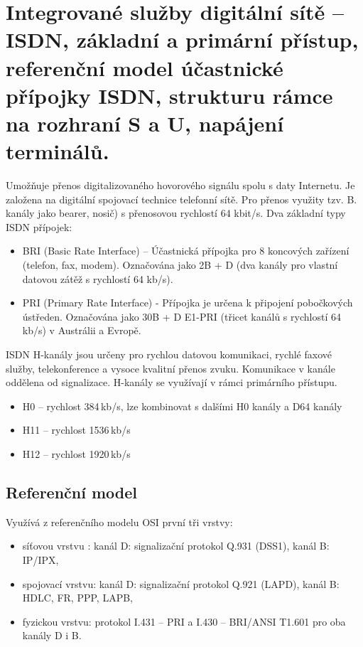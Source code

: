 \clearpage
\section{Integrované služby digitální sítě – ISDN, základní a primární přístup, referenční model účastnické přípojky ISDN, strukturu rámce na rozhraní S a U, napájení terminálů.}
Umožňuje přenos digitalizovaného hovorového signálu spolu s daty Internetu. Je založena na digitální spojovací technice telefonní sítě.
Pro přenos využity tzv. B. kanály jako bearer, nosič) s přenosovou rychlostí 64 kbit/s.
Dva základní typy ISDN přípojek:
\begin{itemize}
    \item BRI (Basic Rate Interface) – Účastnická přípojka pro 8 koncových zařízení (telefon, fax, modem). Označována jako 2B + D (dva kanály pro vlastní datovou zátěž s rychlostí 64 kb/s).
    \item PRI (Primary Rate Interface) - Přípojka je určena k připojení pobočkových ústředen. Označována jako 30B + D E1-PRI (třicet kanálů s rychlostí 64 kb/s) v Austrálii a Evropě.
\end{itemize}

ISDN H-kanály jsou určeny pro rychlou datovou komunikaci, rychlé faxové služby, telekonference a vysoce kvalitní přenos zvuku. Komunikace v kanále oddělena od signalizace. H-kanály se využívají v rámci primárního přístupu.
\begin{itemize}
    \item H0 -- rychlost 384\,kb/s, lze kombinovat s dalšími H0 kanály a D64 kanály
    \item H11 -- rychlost 1536\,kb/s
    \item H12 -- rychlost 1920\,kb/s
\end{itemize}

\subsection{Referenční model}
Využívá z referenčního modelu OSI první tři vrstvy:
\begin{itemize}
    \item síťovou vrstvu : kanál D: signalizační protokol Q.931 (DSS1), kanál B: IP/IPX,
    \item spojovací vrstvu: kanál D: signalizační protokol Q.921 (LAPD), kanál B: HDLC, FR, PPP, LAPB,
    \item fyzickou vrstvu: protokol I.431 – PRI a I.430 – BRI/ANSI T1.601 pro oba kanály D i B. 
\end{itemize}

